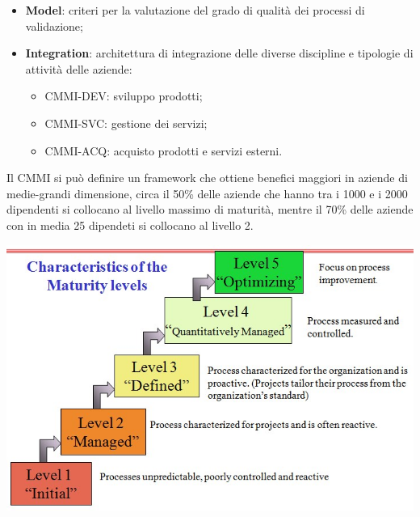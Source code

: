 \begin{itemize}
\begin{itemize}
	\end{itemize}
	\item \textbf{Model}: criteri per la valutazione del grado di qualità dei processi di validazione;
	\item \textbf{Integration}: architettura di integrazione delle diverse discipline e tipologie di attività delle aziende:
	\begin{itemize}
		\item CMMI-DEV: sviluppo prodotti;
		\item CMMI-SVC: gestione dei servizi;
		\item CMMI-ACQ: acquisto prodotti e servizi esterni.
	\end{itemize}	 
\end{itemize}
Il CMMI si può definire un framework che ottiene benefici maggiori in aziende di medie-grandi dimensione, circa il 50\% delle aziende che hanno tra i 1000 e i 2000 dipendenti si collocano al livello massimo di maturità, mentre il 70\% delle aziende con in media 25 dipendeti si collocano al livello 2.

\begin{center}
\item \includegraphics[scale=0.6]{./images/Characteristics_of_the_Maturity_levels.jpg} 
\end{center}

